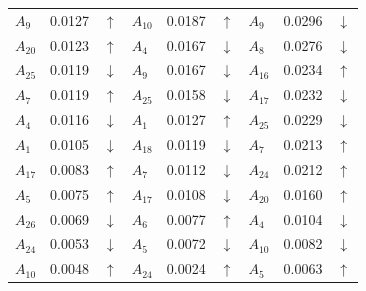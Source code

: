 \documentclass[5p,times]{elsarticle}
\begin{document}
\begin{table}[ht!]
{\begin{tabular}{lrclrclrc}
$A_{9}$ & 0.0127 & $\uparrow$ & $A_{10}$ & 0.0187 & $\uparrow$ & $A_{9}$ & 0.0296 & $\downarrow$ \\
$A_{20}$ & 0.0123 & $\uparrow$ & $A_{4}$ & 0.0167 & $\downarrow$ & $A_{8}$ & 0.0276 & $\downarrow$ \\
$A_{25}$ & 0.0119 & $\downarrow$ & $A_{9}$ & 0.0167 & $\downarrow$ & $A_{16}$ & 0.0234 & $\uparrow$ \\
$A_{7}$ & 0.0119 & $\uparrow$ & $A_{25}$ & 0.0158 & $\downarrow$ & $A_{17}$ & 0.0232 & $\downarrow$ \\
$A_{4}$ & 0.0116 & $\downarrow$ & $A_{1}$ & 0.0127 & $\uparrow$ & $A_{25}$ & 0.0229 & $\downarrow$ \\
$A_{1}$ & 0.0105 & $\downarrow$ & $A_{18}$ & 0.0119 & $\downarrow$ & $A_{7}$ & 0.0213 & $\uparrow$ \\
$A_{17}$ & 0.0083 & $\uparrow$ & $A_{7}$ & 0.0112 & $\downarrow$ & $A_{24}$ & 0.0212 & $\uparrow$ \\
$A_{5}$ & 0.0075 & $\uparrow$ & $A_{17}$ & 0.0108 & $\downarrow$ & $A_{20}$ & 0.0160 & $\uparrow$ \\
$A_{26}$ & 0.0069 & $\downarrow$ & $A_{6}$ & 0.0077 & $\uparrow$ & $A_{4}$ & 0.0104 & $\downarrow$ \\
$A_{24}$ & 0.0053 & $\downarrow$ & $A_{5}$ & 0.0072 & $\downarrow$ & $A_{10}$ & 0.0082 & $\downarrow$ \\
$A_{10}$ & 0.0048 & $\uparrow$ & $A_{24}$ & 0.0024 & $\uparrow$ & $A_{5}$ & 0.0063 & $\uparrow$ \\ \bottomrule
\end{tabular}
}
\end{table}
%
\end{document}
